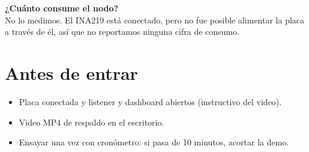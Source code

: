 \documentclass[11pt,a4paper]{article}
\begin{document}
\textbf{¿Cuánto consume el nodo?}\\ No lo medimos. El INA219 está conectado, pero no fue posible alimentar la placa a través de él, así que no reportamos ninguna cifra de consumo.

\section*{Antes de entrar}
\begin{itemize}\item Placa conectada y listener y dashboard abiertos (instructivo del video).
\item Video MP4 de respaldo en el escritorio.
\item Ensayar una vez con cron\'ometro: si pasa de 10 minutos, acortar la demo.
\end{itemize}
\end{document}
